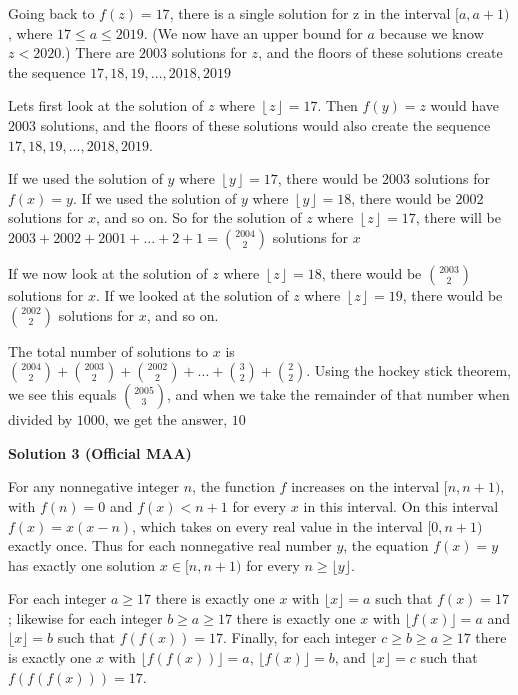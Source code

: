 \begin{enumerate}
 Going back to $f(z) = 17$, there is a single solution for z in the interval $[a, a+1)$, where $17 \leq a \leq 2019$. (We now have an upper bound for $a$ because we know $z < 2020$.) There are $2003$ solutions for $z$, and the floors of these solutions create the sequence $17, 18, 19, ..., 2018, 2019$

 Lets first look at the solution of $z$ where $\left \lfloor{z}\right \rfloor = 17$. Then $f(y) = z$ would have $2003$ solutions, and the floors of these solutions would also create the sequence $17, 18, 19, ..., 2018, 2019$.

 If we used the solution of $y$ where $\left \lfloor{y}\right \rfloor = 17$, there would be $2003$ solutions for $f(x) = y$. If we used the solution of $y$ where $\left \lfloor{y}\right \rfloor = 18$, there would be $2002$ solutions for $x$, and so on. So for the solution of $z$ where $\left \lfloor{z}\right \rfloor = 17$, there will be $2003 + 2002 + 2001 + ... + 2 + 1 = \binom{2004}{2}$ solutions for $x$

 If we now look at the solution of $z$ where $\left \lfloor{z}\right \rfloor = 18$, there would be $\binom{2003}{2}$ solutions for $x$. If we looked at the solution of $z$ where $\left \lfloor{z}\right \rfloor = 19$, there would be $\binom{2002}{2}$ solutions for $x$, and so on.

 The total number of solutions to $x$ is $\binom{2004}{2} + \binom{2003}{2} + \binom{2002}{2} + ... + \binom{3}{2} + \binom{2}{2}$. Using the hockey stick theorem, we see this equals $\binom{2005}{3}$, and when we take the remainder of that number when divided by $1000$, we get the answer, $\boxed{10}$




\textbf{Solution 3 (Official MAA)}

For any nonnegative integer $n$, the function $f$ increases on the interval $[n,n+1)$, with $f(n)=0$ and $f(x)<n+1$ for every $x$ in this interval. On this interval $f(x)=x(x-n)$, which takes on every real value in the interval $[0,n+1)$ exactly once. Thus for each nonnegative real number $y$, the equation $f(x) = y$ has exactly one solution $x \in [n, n+1)$ for every $n \ge \lfloor y \rfloor$.

 For each integer $a\geq 17$ there is exactly one $x$ with $\lfloor x\rfloor=a$ such that $f(x)=17$; likewise for each integer $b\geq a\geq 17$ there is exactly one $x$ with $\lfloor f(x)\rfloor=a$ and $\lfloor x\rfloor=b$ such that $f(f(x))=17$. Finally, for each integer $c \ge b \ge a \ge 17$ there is exactly one $x$ with $\lfloor f(f(x)) \rfloor = a$, $\lfloor f(x)\rfloor=b$, and $\lfloor x\rfloor=c$ such that $f(f(f(x)))=17$.


\end{enumerate}
